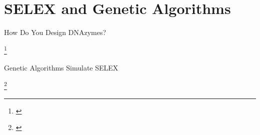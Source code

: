 \documentclass[aspectratio=43]{beamer}
\newcommand\blfootnote[1]{%
    \begingroup
    \renewcommand\thefootnote{}\footnote{#1}%
    \addtocounter{footnote}{-1}%
    \endgroup
}
\begin{document}
\section{SELEX and Genetic Algorithms}
\begin{frame}[fragile]{How Do You Design DNAzymes?}
\begin{figure}[htb!]
\end{figure}
\blfootnote{\cite{selex}}
\end{frame}
\begin{frame}[fragile]{Genetic Algorithms Simulate SELEX}
\begin{figure}[htb!]
\end{figure}
\blfootnote{\cite{ga_web}}
\end{frame}
\end{document}
